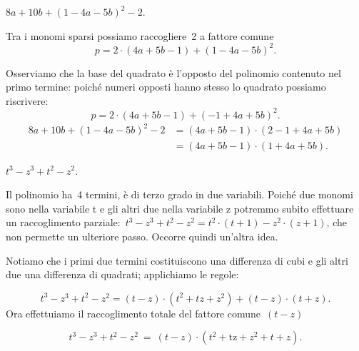  \begin{esempio}
 \(8a+10b+\left(1-4a-5b\right)^{2}-2\).

Tra i monomi sparsi possiamo raccogliere~2 a fattore comune
\[p=2\cdot \left(4a+5b-1\right)+\left(1-4a-5b\right)^{2}.\]

Osserviamo che la base del quadrato è l'opposto del polinomio contenuto
nel primo termine: poiché numeri opposti hanno
stesso lo quadrato possiamo riscrivere:
\[p=2\cdot\left(4a+5b-1\right)+\left(-1+4a+5b\right)^{2}.\]
\begin{align*}
8a+10b+(1-4a-5b)^{2}-2&=\left(4a+5b-1\right)\cdot\left(2-1+4a+5b\right)\\
&=\left(4a+5b-1\right)\cdot\left(1+4a+5b\right).
\end{align*}
 \end{esempio}

 \begin{esempio}
 \(t^{{3}}-z^{{3}}+t^{2}-z^{2}\).

Il polinomio ha~4 termini, è di terzo grado in due variabili.
Poiché due monomi sono nella variabile t e gli altri due nella
variabile z potremmo subito effettuare un raccoglimento
parziale:~\(t^{{3}}-z^{{3}}+t^{2}-z^{2}=
           t^{2}\cdot\left(t+1\right)-z^{2}\cdot \left(z+1\right)\),
che non permette un ulteriore passo. Occorre quindi un'altra idea.

Notiamo che i primi due termini costituiscono una differenza di cubi e
gli altri due una differenza di quadrati; applichiamo le regole:

\begin{equation*}
t^{{3}}-z^{{3}}+t^{2}-z^{2}=\left(t-z\right)\cdot
\left(t^{2}+tz+z^{2}\right)+\left(t-z\right)\cdot
\left(t+z\right).
\end{equation*}
Ora effettuiamo il raccoglimento totale del fattore comune~\((t-z)\)

\begin{equation*}
t^{3}-z^{3}+t^{2}-z^{2}\ =\ \left(t-z\right)\cdot
\left(t^{2}+{\text{tz}}+z^{2}+t+z\right).
\end{equation*}
 \end{esempio}

